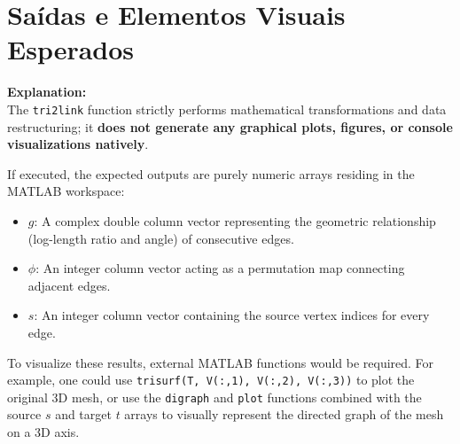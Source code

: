 \section{Saídas e Elementos Visuais Esperados}

\textbf{Explanation:} \\
The \texttt{tri2link} function strictly performs mathematical transformations and data restructuring; it \textbf{does not generate any graphical plots, figures, or console visualizations natively}. 

If executed, the expected outputs are purely numeric arrays residing in the MATLAB workspace:
\begin{itemize}
    \item \textbf{$g$}: A complex double column vector representing the geometric relationship (log-length ratio and angle) of consecutive edges.
    \item \textbf{$\phi$}: An integer column vector acting as a permutation map connecting adjacent edges.
    \item \textbf{$s$}: An integer column vector containing the source vertex indices for every edge.
\end{itemize}

To visualize these results, external MATLAB functions would be required. For example, one could use \texttt{trisurf(T, V(:,1), V(:,2), V(:,3))} to plot the original 3D mesh, or use the \texttt{digraph} and \texttt{plot} functions combined with the source $s$ and target $t$ arrays to visually represent the directed graph of the mesh on a 3D axis.
